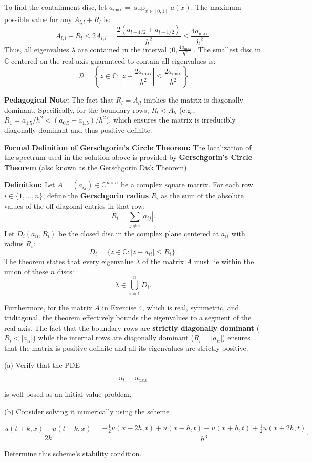 \begin{solution}
To find the containment disc, let $a_{\max} = \sup_{x \in [0,1]} a(x)$. The maximum possible value for any $A_{l,l} + R_l$ is:
\[ A_{l,l} + R_l \leq 2 A_{l,l} = \frac{2(a_{l-1/2} + a_{l+1/2})}{h^2} \leq \frac{4 a_{\max}}{h^2}. \]
Thus, all eigenvalues $\lambda$ are contained in the interval $(0, \frac{4 a_{\max}}{h^2}]$. The smallest disc in $\mathbb{C}$ centered on the real axis guaranteed to contain all eigenvalues is:
\[ \boxed{\mathcal{D} = \left\{ z \in \mathbb{C} : \left| z - \frac{2 a_{\max}}{h^2} \right| \leq \frac{2 a_{\max}}{h^2} \right\}} \]


\textbf{Pedagogical Note:} The fact that $R_l = A_{ll}$ implies the matrix is diagonally dominant. Specifically, for the boundary rows, $R_l < A_{ll}$ (e.g., $R_1 = a_{1.5}/h^2 < (a_{0.5}+a_{1.5})/h^2$), which ensures the matrix is irreducibly diagonally dominant and thus positive definite.

\end{solution}

\begin{remark}
\textbf{Formal Definition of Gerschgorin's Circle Theorem:}
The localization of the spectrum used in the solution above is provided by \textbf{Gerschgorin's Circle Theorem} (also known as the Gerschgorin Disk Theorem).

\textbf{Definition:} Let $A = (a_{ij}) \in \mathbb{C}^{n \times n}$ be a complex square matrix. For each row $i \in \{1, \dots, n\}$, define the \textbf{Gerschgorin radius} $R_i$ as the sum of the absolute values of the off-diagonal entries in that row:
\[ R_i = \sum_{j \neq i} |a_{ij}|. \]
Let $D_i(a_{ii}, R_i)$ be the closed disc in the complex plane centered at $a_{ii}$ with radius $R_i$:
\[ D_i = \{ z \in \mathbb{C} : |z - a_{ii}| \leq R_i \}. \]
The theorem states that every eigenvalue $\lambda$ of the matrix $A$ must lie within the union of these $n$ discs:
\[ \lambda \in \bigcup_{i=1}^n D_i. \]

Furthermore, for the matrix $A$ in Exercise 4, which is real, symmetric, and tridiagonal, the theorem effectively bounds the eigenvalues to a segment of the real axis. The fact that the boundary rows are \textbf{strictly diagonally dominant} ($R_i < |a_{ii}|$) while the internal rows are diagonally dominant ($R_i = |a_{ii}|$) ensures that the matrix is positive definite and all its eigenvalues are strictly positive.
\end{remark}

\begin{exercise}
\label{applied:2024:5}
(a) Verify that the PDE

\[
u _ {t} = u _ {x x x}
\]

is well posed as an initial value problem.

(b) Consider solving it numerically using the scheme

\[
\frac {u (t + k , x) - u (t - k , x)}{2 k} = \frac {- \frac {1}{2} u (x - 2 h , t) + u (x - h , t) - u (x + h , t) + \frac {1}{2} u (x + 2 h , t)}{h^3}.
\]

Determine this scheme’s stability condition.
\end{exercise}

